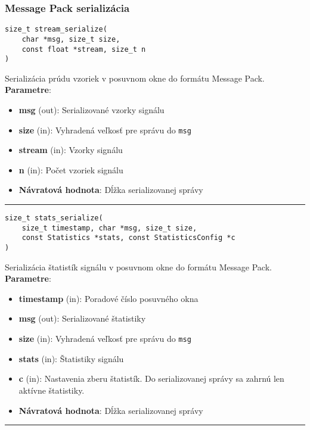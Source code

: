 \subsubsection*{Message Pack serializácia}
\begin{lstlisting}[style=docs]
size_t stream_serialize(
	char *msg, size_t size, 
	const float *stream, size_t n
)
\end{lstlisting}
Serializácia prúdu vzoriek v posuvnom okne do formátu Message Pack. \\ 
\textbf{Parametre}:
\begin{itemize}[noitemsep, topsep=0pt]
	\item \textbf{msg} (out): Serializované vzorky signálu
	\item \textbf{size} (in): Vyhradená veľkosť pre správu do \verb|msg|
	\item \textbf{stream} (in): Vzorky signálu
	\item \textbf{n} (in): Počet vzoriek signálu
 	\item \textbf{Návratová hodnota}: Dĺžka serializovanej správy
\end{itemize}
\bigbreak
\hrule

\begin{lstlisting}[style=docs]
size_t stats_serialize(
	size_t timestamp, char *msg, size_t size, 
	const Statistics *stats, const StatisticsConfig *c
)
\end{lstlisting}
Serializácia štatistík signálu v posuvnom okne do formátu Message Pack. \\ 
\textbf{Parametre}:
\begin{itemize}[noitemsep, topsep=0pt]
	\item \textbf{timestamp} (in): Poradové číslo posuvného okna
 	\item \textbf{msg} (out): Serializované štatistiky
 	\item \textbf{size} (in): Vyhradená veľkosť pre správu do \verb|msg|
 	\item \textbf{stats} (in): Štatistiky signálu
 	\item \textbf{c} (in): Nastavenia zberu štatistík. Do serializovanej správy sa zahrnú len aktívne štatistiky.
 	\item \textbf{Návratová hodnota}: Dĺžka serializovanej správy
\end{itemize}
\bigbreak
\hrule

